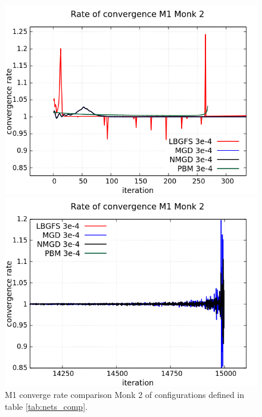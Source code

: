 \begin{figure}[H]
	\centering
	\begin{minipage}[t]{0.525\linewidth}		
		\includegraphics[width=\linewidth]{data/Comparison/Monk2/Monk2_M1_CR_zoomLeft.png}
	\end{minipage}%
	\begin{minipage}[t]{0.525\linewidth}
		\includegraphics[width=\linewidth]{data/Comparison/Monk2/Monk2_M1_CR_zoomRight.png}
	\end{minipage}
	\caption{M1 converge rate comparison Monk 2 of configurations defined in table \ref{tab:nets_comp}.}
	\label{fig:CR-M1-Monk2-Zoom}
\end{figure}


